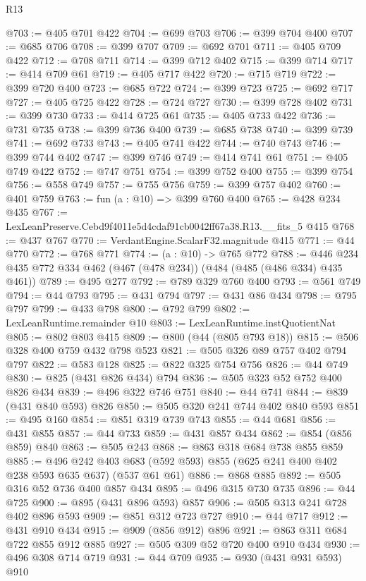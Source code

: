 \begin{lexlean}{R13}
\begin{coremodule}
@703 := @405 @701 @422
@704 := @699 @703
@706 := @399 @704 @400
@707 := @685 @706
@708 := @399 @707
@709 := @692 @701
@711 := @405 @709 @422
@712 := @708 @711
@714 := @399 @712 @402
@715 := @399 @714
@717 := @414 @709 @61
@719 := @405 @717 @422
@720 := @715 @719
@722 := @399 @720 @400
@723 := @685 @722
@724 := @399 @723
@725 := @692 @717
@727 := @405 @725 @422
@728 := @724 @727
@730 := @399 @728 @402
@731 := @399 @730
@733 := @414 @725 @61
@735 := @405 @733 @422
@736 := @731 @735
@738 := @399 @736 @400
@739 := @685 @738
@740 := @399 @739
@741 := @692 @733
@743 := @405 @741 @422
@744 := @740 @743
@746 := @399 @744 @402
@747 := @399 @746
@749 := @414 @741 @61
@751 := @405 @749 @422
@752 := @747 @751
@754 := @399 @752 @400
@755 := @399 @754
@756 := @558 @749
@757 := @755 @756
@759 := @399 @757 @402
@760 := @401 @759
@763 := fun (a : @10) => @399 @760 @400
@765 := @428 @234 @435
@767 := LexLeanPreserve.Cebd9f4011e5d4cdaf91cb0042ff67a38.R13.__fits_5 @415
@768 := @437 @767
@770 := VerdantEngine.ScalarF32.magnitude @415
@771 := @44 @770
@772 := @768 @771
@774 := (a : @10) -> @765 @772
@788 := @446 @234 @435 @772 @334 @462 (@467 (@478 @234)) (@484 (@485 (@486 @334) @435 @461))
@789 := @495 @277
@792 := @789 @329 @760 @400
@793 := @561 @749
@794 := @44 @793
@795 := @431 @794
@797 := @431 @86 @434
@798 := @795 @797
@799 := @433 @798
@800 := @792 @799
@802 := LexLeanRuntime.remainder @10
@803 := LexLeanRuntime.instQuotientNat
@805 := @802 @803 @415
@809 := @800 (@44 (@805 @793 @18))
@815 := @506 @328 @400 @759 @432 @798 @523
@821 := @505 @326 @89 @757 @402 @794 @797
@822 := @583 @128
@825 := @822 @325 @754 @756
@826 := @44 @749
@830 := @825 (@431 @826 @434) @794
@836 := @505 @323 @52 @752 @400 @826 @434
@839 := @496 @322 @746 @751
@840 := @44 @741
@844 := @839 (@431 @840 @593) @826
@850 := @505 @320 @241 @744 @402 @840 @593
@851 := @495 @160
@854 := @851 @319 @739 @743
@855 := @44 @681
@856 := @431 @855
@857 := @44 @733
@859 := @431 @857 @434
@862 := @854 (@856 @859) @840
@863 := @505 @243
@868 := @863 @318 @684 @738 @855 @859
@885 := @496
    @242
    @403
    @683
    (@592 @593)
    @855
    (@625 @241 @400 @402 @238 @593 @635 @637)
    (@537 @61 @61)
@886 := @868 @885
@892 := @505 @316 @52 @736 @400 @857 @434
@895 := @496 @315 @730 @735
@896 := @44 @725
@900 := @895 (@431 @896 @593) @857
@906 := @505 @313 @241 @728 @402 @896 @593
@909 := @851 @312 @723 @727
@910 := @44 @717
@912 := @431 @910 @434
@915 := @909 (@856 @912) @896
@921 := @863 @311 @684 @722 @855 @912 @885
@927 := @505 @309 @52 @720 @400 @910 @434
@930 := @496 @308 @714 @719
@931 := @44 @709
@935 := @930 (@431 @931 @593) @910

\end{coremodule}
\end{lexlean}
